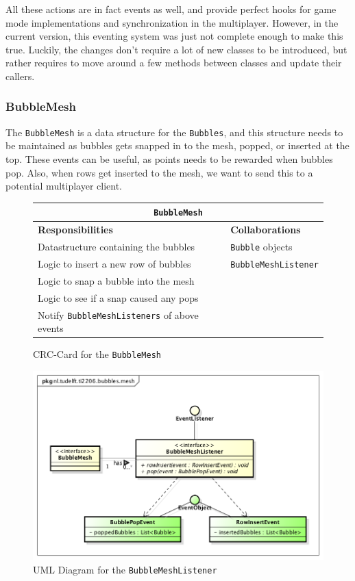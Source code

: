 \documentclass[a4paper]{article}
\begin{document}
\par All these actions are in fact events as well, and provide perfect hooks for game mode implementations and  synchronization in the multiplayer. However, in the current version, this eventing system was just not complete enough to make this true. Luckily, the changes don't require a lot of new classes to be introduced, but rather requires to move around a few methods between classes and update their callers.

\subsubsection*{BubbleMesh}
The \texttt{BubbleMesh} is a data structure for the \texttt{Bubbles}, and this structure needs to be maintained as bubbles gets snapped in to the mesh, popped, or inserted at the top. These events can be useful, as points needs to be rewarded when bubbles pop. Also, when rows get inserted to the mesh, we want to send this to a potential multiplayer client.

\begin{figure}[H]
    \begin{center}
    \begin{tabular}{ | p{8cm} | p{4cm} | }
      \multicolumn{2}{c}{\texttt{BubbleMesh}} \\ \hline
      \textbf{Responsibilities} & \textbf{Collaborations} \\ \hline
      Datastructure containing the bubbles & \texttt{Bubble} objects \\
      Logic to insert a new row of bubbles & \texttt{BubbleMeshListener} \\
      Logic to snap a bubble into the mesh & \\
      Logic to see if a snap caused any pops & \\
      Notify \texttt{BubbleMeshListeners} of above events & \\
      \hline
    \end{tabular}
    \end{center}
    \caption{CRC-Card for the \texttt{BubbleMesh}}
\end{figure}

\begin{figure}[H]
    \centering
    \includegraphics[scale=0.5]{BubbleMeshListener.png}
    \caption{UML Diagram for the \texttt{BubbleMeshListener}}
\end{figure}
\end{document}
